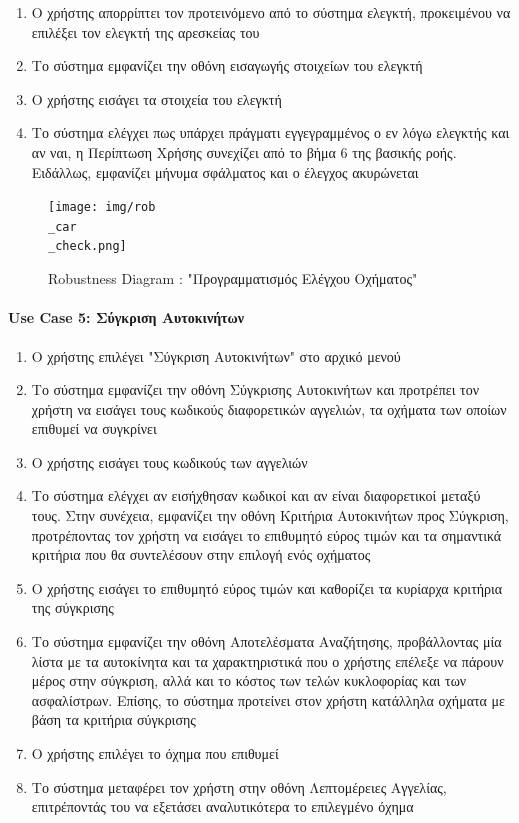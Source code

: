 \documentclass{../ol-softwaremanual}
\begin{document}
	\begin{enumerate}
		\item Ο χρήστης απορρίπτει τον προτεινόμενο από το σύστημα ελεγκτή, προκειμένου να επιλέξει τον ελεγκτή της αρεσκείας του
		\item Το σύστημα εμφανίζει την οθόνη εισαγωγής στοιχείων του ελεγκτή
		\item Ο χρήστης εισάγει τα στοιχεία του ελεγκτή
		\item Το σύστημα ελέγχει πως υπάρχει πράγματι εγγεγραμμένος ο εν λόγω ελεγκτής και αν ναι, η Περίπτωση Χρήσης συνεχίζει από το βήμα 6 της βασικής ροής. Ειδάλλως, εμφανίζει μήνυμα σφάλματος και ο έλεγχος ακυρώνεται	
	\end{enumerate}	


	\begin{figure}[htbp!]
		\texttt{[image: img/rob\\\_car\\\_check.png]}
		\caption{\en Robustness Diagram : "\gr Προγραμματισμός Ελέγχου Οχήματος\en"\gr}
	\end{figure}
	
	
	\newpage
	
	\centering
	\paragraph{\en Use Case 5: \gr Σύγκριση Αυτοκινήτων}
	\begin{enumerate}
		\item Ο χρήστης επιλέγει \en"\gr Σύγκριση Αυτοκινήτων\en" \gr στο αρχικό μενού
		\item Το σύστημα εμφανίζει την οθόνη Σύγκρισης Αυτοκινήτων και προτρέπει τον χρήστη να εισάγει τους κωδικούς διαφορετικών αγγελιών, τα οχήματα των οποίων επιθυμεί να συγκρίνει
		\item Ο χρήστης εισάγει τους κωδικούς των αγγελιών
		\item Το σύστημα ελέγχει αν εισήχθησαν κωδικοί και αν είναι διαφορετικοί μεταξύ τους. Στην συνέχεια, εμφανίζει την οθόνη Κριτήρια Αυτοκινήτων προς Σύγκριση, προτρέποντας τον χρήστη να εισάγει το επιθυμητό εύρος τιμών και τα σημαντικά κριτήρια που θα συντελέσουν στην επιλογή ενός οχήματος
		\item Ο χρήστης εισάγει το επιθυμητό εύρος τιμών και καθορίζει τα κυρίαρχα κριτήρια της σύγκρισης
		\item Το σύστημα εμφανίζει την οθόνη Αποτελέσματα Αναζήτησης, προβάλλοντας μία λίστα με τα αυτοκίνητα και τα χαρακτηριστικά που ο χρήστης επέλεξε να πάρουν μέρος στην σύγκριση, αλλά και το κόστος των τελών κυκλοφορίας και των ασφαλίστρων. Επίσης, το σύστημα προτείνει στον χρήστη κατάλληλα οχήματα με βάση τα κριτήρια σύγκρισης
		\item Ο χρήστης επιλέγει το όχημα που επιθυμεί
		\item Το σύστημα μεταφέρει τον χρήστη στην οθόνη Λεπτομέρειες Αγγελίας, επιτρέποντάς του να εξετάσει αναλυτικότερα το επιλεγμένο όχημα
	\end{enumerate}
	
\end{document}
